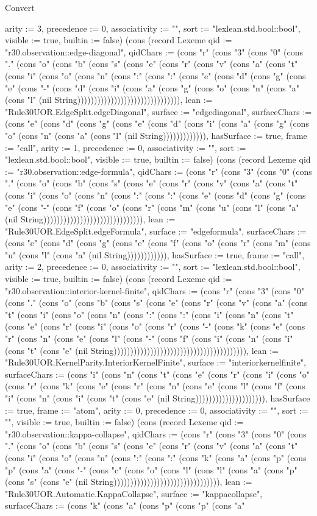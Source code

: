 \begin{lexlean}{Convert}
\begin{semanticmodule}
{arity := 3, precedence := 0, associativity := "", sort := "lexlean.std.bool::bool", visible := true, builtin := false}) (cons (record Lexeme {qid := "r30.observation::edge-diagonal", qidChars := (cons "r" (cons "3" (cons "0" (cons "." (cons "o" (cons "b" (cons "s" (cons "e" (cons "r" (cons "v" (cons "a" (cons "t" (cons "i" (cons "o" (cons "n" (cons ":" (cons ":" (cons "e" (cons "d" (cons "g" (cons "e" (cons "-" (cons "d" (cons "i" (cons "a" (cons "g" (cons "o" (cons "n" (cons "a" (cons "l" (nil String))))))))))))))))))))))))))))))), lean := "Rule30UOR.EdgeSplit.edgeDiagonal", surface := "edgediagonal", surfaceChars := (cons "e" (cons "d" (cons "g" (cons "e" (cons "d" (cons "i" (cons "a" (cons "g" (cons "o" (cons "n" (cons "a" (cons "l" (nil String))))))))))))), hasSurface := true, frame := "call", arity := 1, precedence := 0, associativity := "", sort := "lexlean.std.bool::bool", visible := true, builtin := false}) (cons (record Lexeme {qid := "r30.observation::edge-formula", qidChars := (cons "r" (cons "3" (cons "0" (cons "." (cons "o" (cons "b" (cons "s" (cons "e" (cons "r" (cons "v" (cons "a" (cons "t" (cons "i" (cons "o" (cons "n" (cons ":" (cons ":" (cons "e" (cons "d" (cons "g" (cons "e" (cons "-" (cons "f" (cons "o" (cons "r" (cons "m" (cons "u" (cons "l" (cons "a" (nil String)))))))))))))))))))))))))))))), lean := "Rule30UOR.EdgeSplit.edgeFormula", surface := "edgeformula", surfaceChars := (cons "e" (cons "d" (cons "g" (cons "e" (cons "f" (cons "o" (cons "r" (cons "m" (cons "u" (cons "l" (cons "a" (nil String)))))))))))), hasSurface := true, frame := "call", arity := 2, precedence := 0, associativity := "", sort := "lexlean.std.bool::bool", visible := true, builtin := false}) (cons (record Lexeme {qid := "r30.observation::interior-kernel-finite", qidChars := (cons "r" (cons "3" (cons "0" (cons "." (cons "o" (cons "b" (cons "s" (cons "e" (cons "r" (cons "v" (cons "a" (cons "t" (cons "i" (cons "o" (cons "n" (cons ":" (cons ":" (cons "i" (cons "n" (cons "t" (cons "e" (cons "r" (cons "i" (cons "o" (cons "r" (cons "-" (cons "k" (cons "e" (cons "r" (cons "n" (cons "e" (cons "l" (cons "-" (cons "f" (cons "i" (cons "n" (cons "i" (cons "t" (cons "e" (nil String)))))))))))))))))))))))))))))))))))))))), lean := "Rule30UOR.KernelParity.InteriorKernelFinite", surface := "interiorkernelfinite", surfaceChars := (cons "i" (cons "n" (cons "t" (cons "e" (cons "r" (cons "i" (cons "o" (cons "r" (cons "k" (cons "e" (cons "r" (cons "n" (cons "e" (cons "l" (cons "f" (cons "i" (cons "n" (cons "i" (cons "t" (cons "e" (nil String))))))))))))))))))))), hasSurface := true, frame := "atom", arity := 0, precedence := 0, associativity := "", sort := "", visible := true, builtin := false}) (cons (record Lexeme {qid := "r30.observation::kappa-collapse", qidChars := (cons "r" (cons "3" (cons "0" (cons "." (cons "o" (cons "b" (cons "s" (cons "e" (cons "r" (cons "v" (cons "a" (cons "t" (cons "i" (cons "o" (cons "n" (cons ":" (cons ":" (cons "k" (cons "a" (cons "p" (cons "p" (cons "a" (cons "-" (cons "c" (cons "o" (cons "l" (cons "l" (cons "a" (cons "p" (cons "s" (cons "e" (nil String)))))))))))))))))))))))))))))))), lean := "Rule30UOR.Automatic.KappaCollapse", surface := "kappacollapse", surfaceChars := (cons "k" (cons "a" (cons "p" (cons "p" (cons "a" }
\end{semanticmodule}
\end{lexlean}
